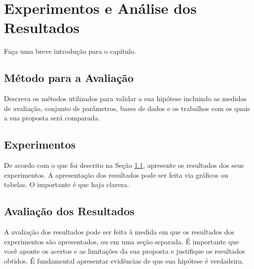 \chapter[Experimentos e Análise dos Resultados]{Experimentos e Análise dos Resultados}
\label{experimentos}

Faça uma breve introdução para o capítulo.

\section{Método para a Avaliação}
\label{metodo}
Descreva os métodos utilizados para validar a sua hipótese incluindo as medidas de avaliação, conjunto de parâmetros, bases de dados e os trabalhos com os quais a sua proposta será comparada.

\section{Experimentos}
De acordo com o que foi descrito na Seção \ref{metodo}, apresente os resultados dos seus experimentos. A apresentação dos resultados pode ser feita via gráficos ou tabelas. O importante é que haja clareza.


\section{Avaliação dos Resultados}
\label{avaliacao}

A avaliação dos resultados pode ser feita à medida em que os resultados dos experimentos são apresentados, ou em uma seção separada. É importante que você aponte os acertos e as limitações da sua proposta e justifique os resultados obtidos. É fundamental apresentar evidências de que sua hipótese é verdadeira.